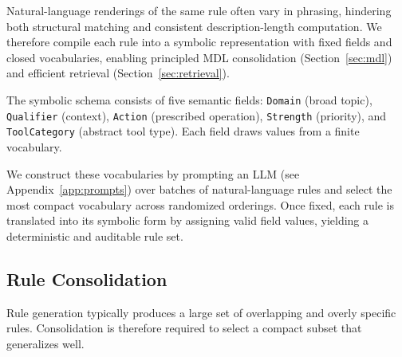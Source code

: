 \documentclass[11pt]{article}
\begin{document}
Natural-language renderings of the same rule often vary in phrasing, hindering both structural matching and consistent description-length computation. We therefore compile each rule into a symbolic representation with fixed fields and closed vocabularies, enabling principled MDL consolidation (Section~\ref{sec:mdl}) and efficient retrieval (Section~\ref{sec:retrieval}). 

The symbolic schema consists of five semantic fields: \texttt{Domain} (broad topic), \texttt{Qualifier} (context), \texttt{Action} (prescribed operation), \texttt{Strength} (priority), and \texttt{ToolCategory} (abstract tool type). Each field draws values from a finite vocabulary. 

We construct these vocabularies by prompting an LLM (see Appendix~\ref{app:prompts}) over batches of natural-language rules and select the most compact vocabulary across randomized orderings. Once fixed, each rule is translated into its symbolic form by assigning valid field values, yielding a deterministic and auditable rule set.


\subsection{Rule Consolidation}
\label{sec:consolidate}

Rule generation typically produces a large set of overlapping and overly specific rules.
Consolidation is therefore required to select a compact subset that generalizes well.

\end{document}
